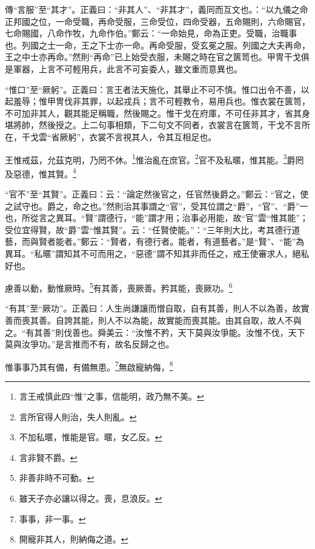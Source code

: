 {\noindent\zhuan{}\fzbyks 傳“言服”至“其才”。正義曰：“非其人”、“非其才”，義同而互文也。：“以九儀之命正邦國之位，一命受職，再命受服，三命受位，四命受器，五命賜則，六命賜官，七命賜國，八命作牧，九命作伯。”鄭云：“一命始見，命為正吏。受職，治職事也。列國之士一命，王之下士亦一命。再命受服，受玄冕之服。列國之大夫再命，王之中士亦再命。”然則“再命”已上始受衣服，未賜之時在官之篋笥也。甲冑干戈俱是軍器，上言不可輕用兵，此言不可妄委人，雖文重而意異也。 \par}

{\noindent\shu{}\fzkt “惟口”至“厥躬”。正義曰：言王者法天施化，其舉止不可不慎。惟口出令不善，以起羞辱；惟甲冑伐非其罪，以起戎兵；言不可輕教令，易用兵也。惟衣裳在篋笥，不可加非其人，觀其能足稱職，然後賜之。惟干戈在府庫，不可任非其才，省其身堪將帥，然後授之。上二句事相類，下二句文不同者，衣裳言在篋笥，干戈不言所在，干戈雲“省厥躬”，衣裳不言視其人，令其互相足也。 \par}

王惟戒茲，允茲克明，乃罔不休。\footnote{言王戒慎此四“惟”之事，信能明，政乃無不美。}惟治亂在庶官。\footnote{言所官得人則治，失人則亂。}官不及私暱，惟其能。\footnote{不加私暱，惟能是官。暱，女乙反。}爵罔及惡德，惟其賢。\footnote{言非賢不爵。}

{\noindent\shu{}\fzkt “官不”至“其賢”。正義曰：云：“論定然後官之，任官然後爵之。”鄭云：“官之，使之試守也。爵之，命之也。”然則治其事謂之“官”，受其位謂之“爵”，“官”、“爵”一也，所從言之異耳。“賢”謂德行，“能”謂才用；治事必用能，故“官”雲“惟其能”；受位宜得賢，故“爵”雲“惟其賢”。云：“任賢使能。”：“三年則大比，考其德行道藝，而與賢者能者。”鄭云：“賢者，有德行者。能者，有道藝者。”是“賢”、“能”為異耳。“私暱”謂知其不可而用之，“惡德”謂不知其非而任之，戒王使審求人，絕私好也。 \par}

慮善以動，動惟厥時。\footnote{非善非時不可動。}有其善，喪厥善。矜其能，喪厥功。\footnote{雖天子亦必讓以得之。喪，息浪反。}

{\noindent\shu{}\fzkt “有其”至“厥功”。正義曰：人生尚謙讓而憎自取，自有其善，則人不以為善，故實善而喪其善。自誇其能，則人不以為能，故實能而喪其能。由其自取，故人不與之。“有其善”則伐善也。舜美云：“汝惟不矜，天下莫與汝爭能。汝惟不伐，天下莫與汝爭功。”是言推而不有，故名反歸之也。 \par}

惟事事乃其有備，有備無患。\footnote{事事，非一事。}無啟寵納侮，\footnote{開寵非其人，則納侮之道。}

